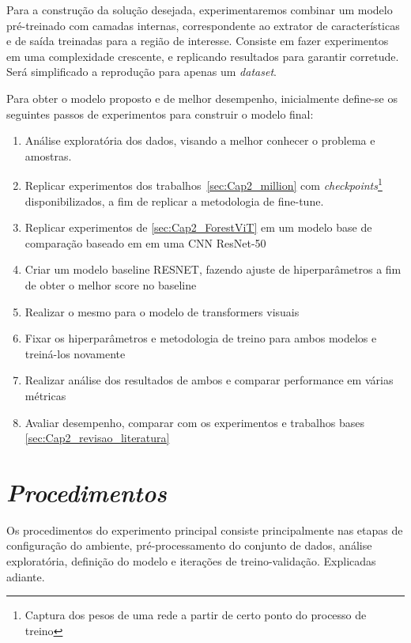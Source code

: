 Para a construção da solução desejada, experimentaremos combinar um modelo pré-treinado com camadas internas, correspondente ao extrator de características e de saída treinadas para a região de interesse.
Consiste em fazer experimentos em uma complexidade crescente, e replicando resultados para garantir corretude. Será simplificado a reprodução para apenas um \textit{dataset}.


Para obter o modelo proposto e de melhor desempenho, inicialmente define-se os seguintes passos de experimentos para construir o modelo final:

\begin{enumerate}
\item   Análise exploratória dos dados, visando a melhor conhecer o problema e amostras. 
\item   Replicar experimentos dos trabalhos~\ref{sec:Cap2_million} com \textit{checkpoints}\footnote{Captura dos pesos de uma rede a partir de certo ponto do processo de treino} disponibilizados, a fim de replicar a metodologia de fine-tune. 
\item   Replicar experimentos de \ref{sec:Cap2_ForestViT} em um modelo base de comparação baseado em em uma CNN ResNet-50
\item   Criar um modelo baseline RESNET, fazendo ajuste de hiperparâmetros a fim de obter o melhor score no baseline
\item   Realizar o mesmo para o modelo de transformers visuais
\item   Fixar os hiperparâmetros e metodologia de treino para ambos modelos e treiná-los novamente
\item   Realizar análise dos resultados de ambos e comparar performance em várias métricas
\item   Avaliar desempenho, comparar com os experimentos e trabalhos bases \ref{sec:Cap2_revisao_literatura}
\end{enumerate}


    

\section{\textit{Procedimentos}}\label{sec:Cap3_Procedimentos}

Os procedimentos do experimento principal consiste principalmente nas etapas de configuração do ambiente, pré-processamento do conjunto de dados, análise exploratória, definição do modelo e iterações de treino-validação. Explicadas adiante.

